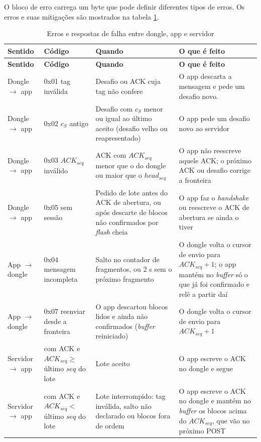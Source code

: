 \documentclass[
	12pt,
	article,			%
	oneside,
	a4paper,
	english,
	brazil				%
	]{abntex2}
\begin{document}
O bloco de erro carrega um byte que pode definir diferentes tipos de erros. Os erros e suas mitigações são mostrados na tabela \ref{tab:erros-bloco}.

\begin{longtable}{|>{\raggedright\arraybackslash}p{}|>{\raggedright\arraybackslash}p{}|>{\raggedright\arraybackslash}p{}|>{\raggedright\arraybackslash}p{}|}
	\caption{Erros e respostas de falha entre dongle, app e servidor}
	\label{tab:erros-bloco} \\
	\hline
	\textbf{Sentido} & \textbf{Código} & \textbf{Quando} & \textbf{O que é feito} \\
	\hline
	\endfirsthead
	\hline
	\textbf{Sentido} & \textbf{Código} & \textbf{Quando} & \textbf{O que é feito} \\
	\hline
	\endhead
	\hline
	\endfoot
	Dongle $\rightarrow$ app & 0x01 tag inválida & Desafio ou ACK cuja tag não confere & O app descarta a mensagem e pede um desafio novo. \\
	\hline
	Dongle $\rightarrow$ app & 0x02 $c_S$ antigo & Desafio com $c_S$ menor ou igual ao último aceito (desafio velho ou reapresentado) & O app pede um desafio novo ao servidor \\
	\hline
	Dongle $\rightarrow$ app & 0x03 $ACK_{seq}$ inválido & ACK com $ACK_{seq}$ menor que o do dongle ou maior que o $head_{seq}$ & O app não reescreve aquele ACK; o próximo ACK ou desafio corrige a fronteira \\
	\hline
	Dongle $\rightarrow$ app & 0x05 sem sessão & Pedido de lote antes do ACK de abertura, ou após descarte de blocos não confirmados por \textit{flash} cheia & O app faz o \textit{handshake} ou reescreve o ACK de abertura se ainda o tiver \\
	\hline
	App $\rightarrow$ dongle & 0x04 mensagem incompleta & Salto no contador de fragmentos, ou 2 s sem o próximo fragmento & O dongle volta o cursor de envio para $ACK_{seq} + 1$; o app mantém no \textit{buffer} só o que já foi confirmado e relê a partir daí \\
	\hline
	App $\rightarrow$ dongle & 0x07 reenviar desde a fronteira & O app descartou blocos lidos e ainda não confirmados (\textit{buffer} reiniciado) & O dongle volta o cursor de envio para $ACK_{seq} + 1$ \\
	\hline
	Servidor $\rightarrow$ app & 200 com ACK e $ACK_{seq} \geq$ último $seq$ do lote & Lote aceito & O app escreve o ACK no dongle e segue \\
	\hline
	Servidor $\rightarrow$ app & 200 com ACK e $ACK_{seq} <$ último $seq$ do lote & Lote interrompido: tag inválida, salto não declarado ou blocos fora de ordem & O app escreve o ACK no dongle e mantém no \textit{buffer} os blocos acima do $ACK_{seq}$, que vão no próximo POST \\

\end{longtable}
\end{document}
